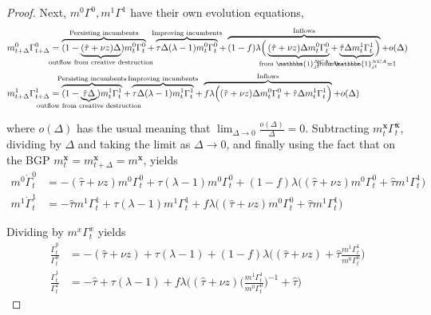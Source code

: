 \documentclass[11pt,english]{article}
\begin{document}
\begin{proof}
	Next, $m^0\Gamma^0,m^1\Gamma^1$ have their own evolution equations,
	\begin{align}
		m_{t+\Delta}^0\Gamma^0_{t+\Delta} &= \overbrace{(1 - \underbrace{(\hat{\tau} + \nu z) \Delta }_{\mathclap{\text{outflow from creative destruction}}} ) m^0_t  \Gamma_t^0}^{\mathclap{\text{Persisting incumbents}}} + \overbrace{\tau \Delta (\lambda - 1)m_t^0 \Gamma_t^0}^{\mathclap{\text{Improving incumbents}}} + \overbrace{(1-f) \lambda \Big( \underbrace{(\hat{\tau} + \nu z) \Delta m_t^0  \Gamma_t^0}_{\mathclap{\text{from } \mathbbm{1}^{NCA}_{jt} = 0}} +  \underbrace{\hat{\tau} \Delta m_t^1  \Gamma_t^1}_{\mathclap{\text{from } \mathbbm{1}^{NCA}_{jt} = 1}} \Big)}^{\mathclap{\text{Inflows}}} + o(\Delta)\\
		m_{t+\Delta}^1 \Gamma^1_{t+\Delta} &= \overbrace{(1 - \underbrace{\hat{\tau} \Delta }_{\mathclap{\text{outflow from creative destruction}}}) m^1_t  \Gamma_t^1}^{\mathclap{\text{Persisting incumbents}}}  + \overbrace{\tau \Delta (\lambda -1 ) m_t^1 \Gamma_t^1}^{\mathclap{\text{Improving incumbents}}}  + \overbrace{f \lambda \Big( (\hat{\tau} + \nu z) \Delta m_t^0  \Gamma_t^0 + \hat{\tau} \Delta m_t^1  \Gamma_t^1 \Big)}^{\mathclap{\text{Inflows}}} + o(\Delta) 
	\end{align}
	
	where $o(\Delta)$ has the usual meaning that $\lim_{\Delta \to 0} \frac{o(\Delta)}{\Delta} = 0$. Subtracting $m_t^{\mathbf{x}} \Gamma_t^{\mathbf{x}}$, dividing by $\Delta$ and taking the limit as $\Delta \to 0$, and finally using the fact that on the BGP $m_t^{\mathbf{x}} = m_{t+\Delta}^{\mathbf{x}} = m^{\mathbf{x}}$, yields
	\begin{align}
		m^0 \dot{\Gamma}_t^0 &= -(\hat{\tau} + \nu z) m^0 \Gamma_t^0 + \tau (\lambda - 1) m^0 \Gamma_t^0 + (1-f)\lambda \Big( (\hat{\tau} + \nu z) m^0 \Gamma_t^0 + \hat{\tau} m^1 \Gamma_t^1 \Big) \\
		m^1 \dot{\Gamma}_t^1 &= -\hat{\tau} m^1 \Gamma_t^1 + \tau (\lambda - 1) m^1 \Gamma_t^1 + f\lambda \Big( (\hat{\tau} + \nu z) m^0 \Gamma_t^0 + \hat{\tau} m^1 \Gamma_t^1 \Big)
	\end{align}
	
	Dividing by $m^x \Gamma_t^x$ yields
	\begin{align}
	\frac{\dot{\Gamma}_t^0}{\Gamma_t^0} &= -( \hat{\tau} + \nu z) + \tau (\lambda - 1) + (1-f)\lambda \Big( (\hat{\tau} + \nu z) + \hat{\tau} \frac{m^1 \Gamma_t^1 }{m^0 \Gamma_t^0}\Big) \\
	\frac{\dot{\Gamma}_t^1}{\Gamma_t^1} &= -\hat{\tau}  + \tau (\lambda - 1) + f\lambda \Big( (\hat{\tau} + \nu z) \big(\frac{m^1 \Gamma_t^1}{m^0 \Gamma_t^0}\big)^{-1} + \hat{\tau}  \Big)
	\end{align}
	

\end{proof}
\end{document}
